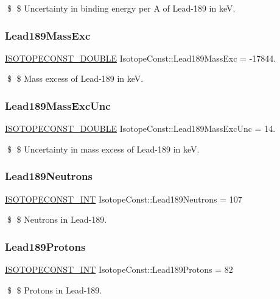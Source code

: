 \$ \$ Uncertainty in binding energy per A of Lead-\/189 in keV. \mbox{\label{group___isotope_const-_lead-_pb189_gac300c3b92cdce1c57647b22df8222e62}} 
\subsubsection{\texorpdfstring{Lead189\+Mass\+Exc}{Lead189MassExc}}
{\footnotesize\ttfamily \mbox{\hyperlink{group___isotope_const-_macros_ga8f45a7272ce02c0b4c65c44636ed719a}{I\+S\+O\+T\+O\+P\+E\+C\+O\+N\+S\+T\+\_\+\+D\+O\+U\+B\+LE}} Isotope\+Const\+::\+Lead189\+Mass\+Exc = -\/17844.}

\$ \$ Mass excess of Lead-\/189 in keV. \mbox{\label{group___isotope_const-_lead-_pb189_gae88503ad80d3337d4f5c5f7ec3c828a3}} 
\subsubsection{\texorpdfstring{Lead189\+Mass\+Exc\+Unc}{Lead189MassExcUnc}}
{\footnotesize\ttfamily \mbox{\hyperlink{group___isotope_const-_macros_ga8f45a7272ce02c0b4c65c44636ed719a}{I\+S\+O\+T\+O\+P\+E\+C\+O\+N\+S\+T\+\_\+\+D\+O\+U\+B\+LE}} Isotope\+Const\+::\+Lead189\+Mass\+Exc\+Unc = 14.}

\$ \$ Uncertainty in mass excess of Lead-\/189 in keV. \mbox{\label{group___isotope_const-_lead-_pb189_ga1aeb40e67e773efe05158e8c89cc7ba8}} 
\subsubsection{\texorpdfstring{Lead189\+Neutrons}{Lead189Neutrons}}
{\footnotesize\ttfamily \mbox{\hyperlink{group___isotope_const-_macros_ga5f18360b3e99483a35c32d789e62621c}{I\+S\+O\+T\+O\+P\+E\+C\+O\+N\+S\+T\+\_\+\+I\+NT}} Isotope\+Const\+::\+Lead189\+Neutrons = 107}

\$ \$ Neutrons in Lead-\/189. \mbox{\label{group___isotope_const-_lead-_pb189_gab79be5c804678cb09df909834d82d78d}} 
\subsubsection{\texorpdfstring{Lead189\+Protons}{Lead189Protons}}
{\footnotesize\ttfamily \mbox{\hyperlink{group___isotope_const-_macros_ga5f18360b3e99483a35c32d789e62621c}{I\+S\+O\+T\+O\+P\+E\+C\+O\+N\+S\+T\+\_\+\+I\+NT}} Isotope\+Const\+::\+Lead189\+Protons = 82}

\$ \$ Protons in Lead-\/189. 
